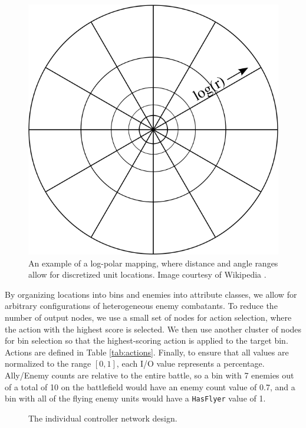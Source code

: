 \documentclass[10pt,a4paper,twocolumn]{article}
\begin{document}
\begin{figure}
\centering
\includegraphics[scale=.3]{figures/logpolar.png}
\caption{An example of a log-polar mapping, where distance and angle ranges allow for discretized unit locations. Image courtesy of Wikipedia \cite{logpolar}.}
\end{figure}

By organizing locations into bins and enemies into attribute classes, we allow for arbitrary configurations of heterogeneous enemy combatants. To reduce the number of output nodes, we use a small set of nodes for action selection, where the action with the highest score is selected. We then use another cluster of nodes for bin selection so that the highest-scoring action is applied to the target bin. Actions are defined in Table \ref{tab:actions}. Finally, to ensure that all values are normalized to the range $[0,1]$, each I/O value represents a percentage. Ally/Enemy counts are relative to the entire battle, so a bin with 7 enemies out of a total of 10 on the battlefield would have an enemy count value of 0.7, and a bin with all of the flying enemy units would have a \texttt{HasFlyer} value of 1.

\begin{figure}

\caption{The individual controller network design.}
\label{fig:design_individual}
\end{figure}
\end{document}
